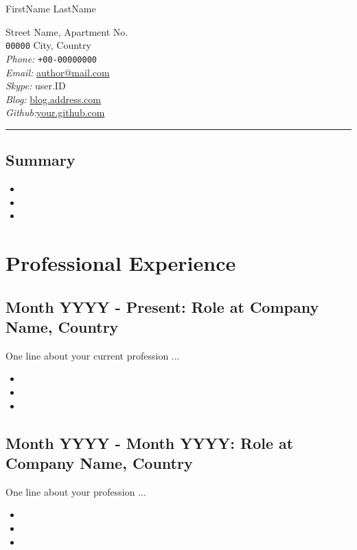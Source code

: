 \documentclass[11pt, a4paper]{article}
\begin{document}
{\LARGE FirstName LastName} \\
\begin{multicols}{2}
Street Name, Apartment No.\\ \texttt{00000} City, Country\\
\textit{Phone:} \texttt{+00-00000000}\\
\textit{Email:} \href{mailto:author@mail.com}{author@mail.com}\\
\textit{Skype:} user.ID\\
\textit{Blog:} \href{blog.address.com}{blog.address.com}\\
\textit{Github:}\href{your.github.com}{your.github.com}\\
\end{multicols}
\hrule

\subsection*{Summary}
\begin{itemize}\addtolength{\itemsep}{-0.5\baselineskip}
\item
\item
\item
\end{itemize}

\dotfill

\section*{Professional Experience}
\subsection*{Month YYYY - Present: Role at Company Name, Country}
One line about your current profession ...
\begin{itemize}\addtolength{\itemsep}{-0.5\baselineskip}
\item
\item
\item
\end{itemize}
\subsection*{Month YYYY - Month YYYY: Role at Company Name, Country}
One line about your profession ...
\begin{itemize}\addtolength{\itemsep}{-0.5\baselineskip}
\item
\item
\item
\end{itemize}
\end{document}
